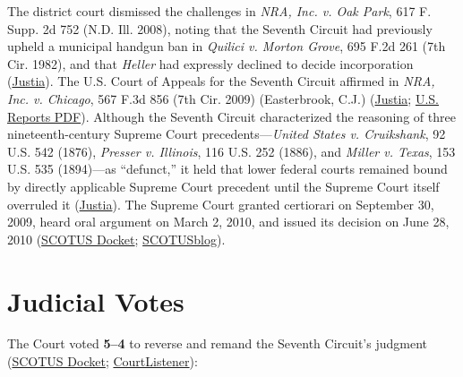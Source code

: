 \documentclass[12pt]{article}
\begin{document}
The district court dismissed the challenges in \textit{NRA, Inc. v. Oak Park}, 617 F. Supp. 2d 752 (N.D. Ill. 2008), noting that the Seventh Circuit had previously upheld a municipal handgun ban in \textit{Quilici v. Morton Grove}, 695 F.2d 261 (7th Cir. 1982), and that \textit{Heller} had expressly declined to decide incorporation (\href{https://supreme.justia.com/cases/federal/us/561/742/}{Justia}). The U.S. Court of Appeals for the Seventh Circuit affirmed in \textit{NRA, Inc. v. Chicago}, 567 F.3d 856 (7th Cir. 2009) (Easterbrook, C.J.) (\href{https://supreme.justia.com/cases/federal/us/561/742/}{Justia}; \href{https://tile.loc.gov/storage-services/service/ll/usrep/usrep561/usrep561742/usrep561742.pdf}{U.S. Reports PDF}). Although the Seventh Circuit characterized the reasoning of three nineteenth-century Supreme Court precedents---\textit{United States v. Cruikshank}, 92 U.S. 542 (1876), \textit{Presser v. Illinois}, 116 U.S. 252 (1886), and \textit{Miller v. Texas}, 153 U.S. 535 (1894)---as ``defunct,'' it held that lower federal courts remained bound by directly applicable Supreme Court precedent until the Supreme Court itself overruled it (\href{https://supreme.justia.com/cases/federal/us/561/742/}{Justia}). The Supreme Court granted certiorari on September 30, 2009, heard oral argument on March 2, 2010, and issued its decision on June 28, 2010 (\href{https://www.supremecourt.gov/docket/docketfiles/html/public/08-1521.html}{SCOTUS Docket}; \href{https://www.scotusblog.com/cases/mcdonald-v-city-of-chicago/}{SCOTUSblog}).

\section{Judicial Votes}

The Court voted \textbf{5--4} to reverse and remand the Seventh Circuit's judgment (\href{https://www.supremecourt.gov/docket/docketfiles/html/public/08-1521.html}{SCOTUS Docket}; \href{https://www.courtlistener.com/opinion/149702/mcdonald-v-city-of-chicago/}{CourtListener}):
\end{document}
